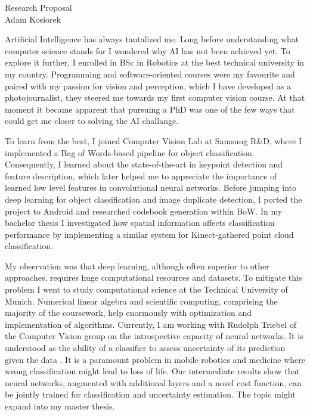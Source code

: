 \documentclass[12pt]{article}
\begin{document}
\begin{center}
{\Large Research Proposal} \\[.1in]
{\large Adam Kosiorek}
\end{center}

\vspace*{.1in}

Artificial Intelligence has always tantalized me. Long before understanding what computer science stands for I wondered why AI has not been achieved yet. To explore it further, I enrolled in BSc in Robotics at the best technical university in my country. Programming and software-oriented courses were my favourite and paired with my passion for vision and perception, which I have developed as a photojournalist, they steered me towards my first computer vision course. At that moment it became apparent that pursuing a PhD was one of the few ways that could get me closer to solving the AI challange.

To learn from the best, I joined Computer Vision Lab at Samsung R\&D, where I implemented a Bag of Words-based pipeline for object classification. Consequently, I learned about the state-of-the-art in keypoint detection and feature description, which later helped me to appreciate the importance of learned low level features in convolutional neural networks. Before jumping into deep learning for object classification and image duplicate detection, I ported the project to Android and researched codebook generation within BoW. In my bachelor thesis I investigated how spatial information affects classification performance by implementing a similar system for Kinect-gathered point cloud classification.

My observation was that deep learning, although often superior to other approaches, requires huge computational resources and datasets. To mitigate this problem I went to study computational science at the Technical University of Munich. Numerical linear algebra and scientific computing, comprising the majority of the coursework, help enormously with optimization and implementation of algorithms. Currently, I am working with Rudolph Triebel of the Computer Vision group on the introspective capacity of neural networks. It is understood as the ability of a classifier to assess uncertainty of its prediction given the data \cite{introspective}. It is a paramount problem in mobile robotics and medicine where wrong classification might lead to loss of life. Our intermediate results show that neural networks, augmented with additional layers and a novel cost function, can be jointly trained for classification and uncertainty estimation. The topic might expand into my master thesis.
\end{document}
